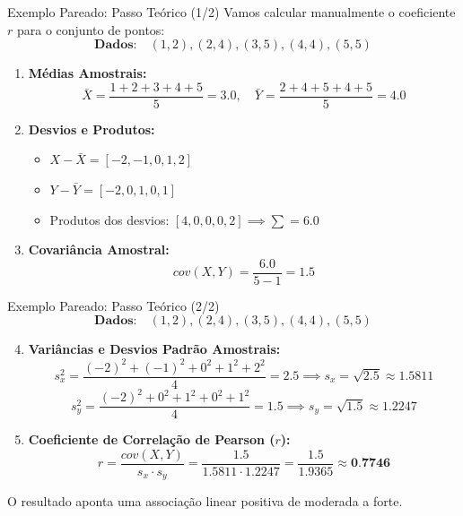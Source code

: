 \begin{frame}{Exemplo Pareado: Passo Teórico (1/2)}
    Vamos calcular manualmente o coeficiente $r$ para o conjunto de pontos:
    $$\textbf{Dados:} \quad (1, 2), (2, 4), (3, 5), (4, 4), (5, 5)$$
    \begin{enumerate}
        \item \textbf{Médias Amostrais:}
        $$\bar{X} = \frac{1+2+3+4+5}{5} = 3.0, \quad \bar{Y} = \frac{2+4+5+4+5}{5} = 4.0$$
        \item \textbf{Desvios e Produtos:}
        \begin{itemize}
            \item $X - \bar{X} = [-2, -1, 0, 1, 2]$
            \item $Y - \bar{Y} = [-2, 0, 1, 0, 1]$
            \item Produtos dos desvios: $[4, 0, 0, 0, 2] \implies \sum = 6.0$
        \end{itemize}
        \item \textbf{Covariância Amostral:}
        $$cov(X, Y) = \frac{6.0}{5 - 1} = 1.5$$
    \end{enumerate}
\end{frame}

\begin{frame}{Exemplo Pareado: Passo Teórico (2/2)}
    $$\textbf{Dados:} \quad (1, 2), (2, 4), (3, 5), (4, 4), (5, 5)$$
    \begin{enumerate}
        \setcounter{enumi}{3}
        \item \textbf{Variâncias e Desvios Padrão Amostrais:}
        $$s_x^2 = \frac{(-2)^2 + (-1)^2 + 0^2 + 1^2 + 2^2}{4} = 2.5 \implies s_x = \sqrt{2.5} \approx 1.5811$$
        $$s_y^2 = \frac{(-2)^2 + 0^2 + 1^2 + 0^2 + 1^2}{4} = 1.5 \implies s_y = \sqrt{1.5} \approx 1.2247$$
        \item \textbf{Coeficiente de Correlação de Pearson ($r$):}
        $$r = \frac{cov(X, Y)}{s_x \cdot s_y} = \frac{1.5}{1.5811 \cdot 1.2247} = \frac{1.5}{1.9365} \approx \textbf{0.7746}$$
    \end{enumerate}
    \vspace{0.2cm}
    O resultado aponta uma associação linear positiva de moderada a forte.
\end{frame}

